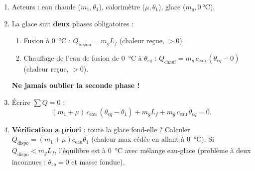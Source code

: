 \documentclass[11pt]{article}
\begin{document}
\begin{methode}
\begin{enumerate}
\item Acteurs : eau chaude ($m_1, \theta_1$), calorimètre ($\mu, \theta_1$), glace ($m_g, \SI{0}{\celsius}$).
\item La glace suit \textbf{deux} phases obligatoires :
  \begin{enumerate}
  \item Fusion à \SI{0}{\celsius} : $Q_{\text{fusion}} = m_g L_f$ (chaleur reçue, $>0$).
  \item Chauffage de l'eau de fusion de \SI{0}{\celsius} à $\theta_{eq}$ : $Q_{\text{chauf}} = m_g\,c_{\text{eau}}\,(\theta_{eq} - 0)$ (chaleur reçue, $>0$).
  \end{enumerate}
  \textbf{Ne jamais oublier la seconde phase !}
\item Écrire $\sum Q = 0$ :
\[ (m_1+\mu)\,c_{\text{eau}}\,(\theta_{eq}-\theta_1) + m_g L_f + m_g\,c_{\text{eau}}\,\theta_{eq} = 0. \]
\item \textbf{Vérification a priori} : toute la glace fond-elle ? Calculer $Q_{\text{dispo}} = (m_1+\mu)c_{\text{eau}}\theta_1$ (chaleur max cédée en allant à \SI{0}{\celsius}). Si $Q_{\text{dispo}} < m_g L_f$, l'équilibre est à \SI{0}{\celsius} avec mélange eau-glace (problème à deux inconnues : $\theta_{eq}=0$ et masse fondue).
\end{enumerate}
\end{methode}
\end{document}
